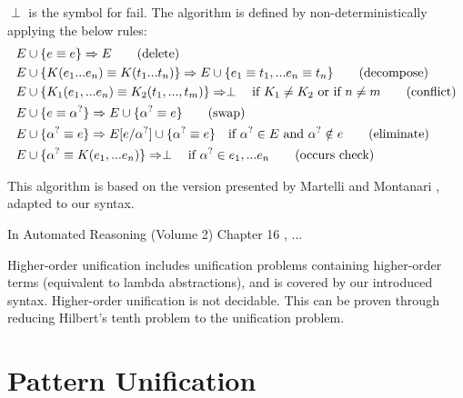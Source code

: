 \documentclass[twoside,12pt,a4paper]{article}
\begin{document}
\begin{definition}
    $\perp$ is the symbol for fail.
    The algorithm is defined by non-deterministically applying the below rules:
    \begin{align*}
        E & \cup \{ e \equiv e\} \Rightarrow E \tag{delete}\\
        E & \cup \{K(e_1 ... e_n) \equiv K(t_1 ... t_n)\} \Rightarrow E \cup \{e_1 \equiv t_1, ... e_n \equiv t_n\}\tag{decompose}\\
        E & \cup \{K_1(e_1,...e_n) \equiv K_2(t_1, ..., t_m)\}  \Rightarrow \perp \quad\text{if $K_1 \neq K_2$ or if $n\neq m$} \tag{conflict}\\
        E & \cup \{e \equiv \alpha^?\} \Rightarrow E \cup \{\alpha^? \equiv e\}\tag{swap}\\ 
        E & \cup \{\alpha^? \equiv e\} \Rightarrow E[e/\alpha^?] \cup \{\alpha^? \equiv e\} \quad\text{if $\alpha^? \in E$ and $\alpha^? \notin e$}  \tag{eliminate}\\
        E & \cup \{\alpha^? \equiv K(e_1,...e_n)\}\Rightarrow \perp \quad \text{if $\alpha^? \in e_1,...e_n$} \tag{occurs check} 
    \end{align*}
\end{definition} 

This algorithm is based on the version presented by Martelli and Montanari \cite{10.1145/357162.357169},
adapted to our syntax.








In Automated Reasoning (Volume 2) Chapter 16 \cite{DBLP:books/el/RV01/Dowek01}, ...

\begin{theorem}
    Higher-order unification includes unification problems containing higher-order terms (equivalent to lambda abstractions),
    and is covered by our introduced syntax. %
    Higher-order unification is not decidable. This can be proven through reducing Hilbert's tenth problem to the unification problem.
\end{theorem}

\section{Pattern Unification}
\end{document}
